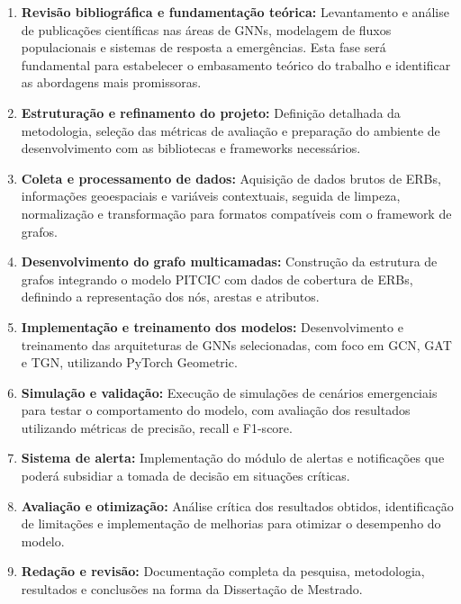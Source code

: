 \begin{enumerate}[label=\arabic*., leftmargin=1.5cm]
    \item \textbf{Revisão bibliográfica e fundamentação teórica:} Levantamento e análise de publicações científicas nas áreas de \gls{GNN}s, modelagem de fluxos populacionais e sistemas de resposta a emergências. Esta fase será fundamental para estabelecer o embasamento teórico do trabalho e identificar as abordagens mais promissoras.
    
    \item \textbf{Estruturação e refinamento do projeto:} Definição detalhada da metodologia, seleção das métricas de avaliação e preparação do ambiente de desenvolvimento com as bibliotecas e frameworks necessários.
    
    \item \textbf{Coleta e processamento de dados:} Aquisição de dados brutos de \gls{ERB}s, informações geoespaciais e variáveis contextuais, seguida de limpeza, normalização e transformação para formatos compatíveis com o framework de grafos.
    
    \item \textbf{Desenvolvimento do grafo multicamadas:} Construção da estrutura de grafos integrando o modelo \gls{PITCIC} com dados de cobertura de \gls{ERB}s, definindo a representação dos nós, arestas e atributos.
    
    \item \textbf{Implementação e treinamento dos modelos:} Desenvolvimento e treinamento das arquiteturas de \gls{GNN}s selecionadas, com foco em GCN, GAT e TGN, utilizando PyTorch Geometric.
    
    \item \textbf{Simulação e validação:} Execução de simulações de cenários emergenciais para testar o comportamento do modelo, com avaliação dos resultados utilizando métricas de precisão, recall e F1-score.
    
    \item \textbf{Sistema de alerta:} Implementação do módulo de alertas e notificações que poderá subsidiar a tomada de decisão em situações críticas.
    
    \item \textbf{Avaliação e otimização:} Análise crítica dos resultados obtidos, identificação de limitações e implementação de melhorias para otimizar o desempenho do modelo.
    
    \item \textbf{Redação e revisão:} Documentação completa da pesquisa, metodologia, resultados e conclusões na forma da Dissertação de Mestrado.
\end{enumerate}

